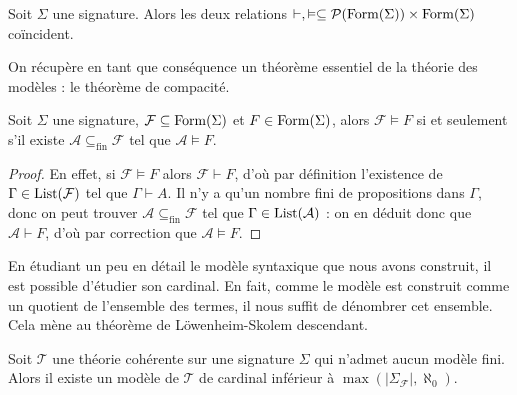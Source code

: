 \begin{theorem}\label{thm.completude}
  Soit $\Sigma$ une signature. Alors les deux relations
  $\vdash,\vDash\subseteq \mathcal{P}(\operatorname{Form}(\Sigma))\times\operatorname{Form}(\Sigma)$
  coïncident.
\end{theorem}

On récupère en tant que conséquence un théorème essentiel de la théorie des
modèles : le théorème de compacité.

\begin{theorem}
  Soit $\Sigma$ une signature, $\mathcal F \subseteq\operatorname{Form}(\Sigma)$ et
  $F\in\operatorname{Form}(\Sigma)$, alors $\mathcal F\vDash F$ si et seulement s'il existe
  $\mathcal A\subseteq_{\mathrm{fin}} \mathcal F$ tel que
  $\mathcal A\vDash F$.
\end{theorem}

\begin{proof}
  En effet, si $\mathcal F\vDash F$ alors $\mathcal F\vdash F$, d'où par
  définition l'existence de $\Gamma\in\operatorname{List}(\mathcal F)$ tel que
  $\Gamma\vdash A$. Il n'y a qu'un nombre fini de propositions dans $\Gamma$,
  donc on peut trouver $\mathcal A\subseteq_{\mathrm{fin}}\mathcal F$ tel que
  $\Gamma\in\operatorname{List}(\mathcal A)$ : on en déduit donc que $\mathcal A\vdash F$,
  d'où par correction que $\mathcal A\vDash F$.
\end{proof}

En étudiant un peu en détail le modèle syntaxique que nous avons construit, il
est possible d'étudier son cardinal. En fait, comme le modèle est construit
comme un quotient de l'ensemble des termes, il nous suffit de dénombrer cet
ensemble. Cela mène au théorème de Löwenheim-Skolem descendant.

\begin{theorem}
  Soit $\mathcal T$ une théorie cohérente sur une signature $\Sigma$ qui
  n'admet aucun modèle fini. Alors il existe un modèle de $\mathcal T$ de
  cardinal inférieur à $\max(|\Sigma_{\mathcal F}|,\aleph_0)$.
\end{theorem}

